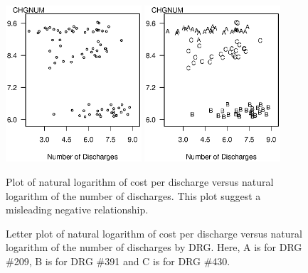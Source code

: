 \begin{figure}[htp]
  \begin{center}
    \includegraphics[width=0.45\textwidth]{Chapter4/F4CostperNumber.eps}
    \includegraphics[width=0.45\textwidth]{Chapter4/F4DRGbyNumber.eps}
    \hfill  $~~~$
    \parbox[t]{2.5in}{\caption{\label{F4:CostperNumber} \small  Plot of natural logarithm of cost per discharge versus natural
logarithm of the number of discharges. This plot suggest a
misleading negative relationship.}} \hfill
    \parbox[t]{2.5in}{\caption{\label{F4:DRGbyNumber} \small  Letter plot of natural logarithm of cost per discharge versus natural
logarithm of the number of discharges by DRG. Here, A is for DRG
\#209, B is for DRG \#391 and C is for DRG \#430.}}
  \end{center}
\end{figure}


